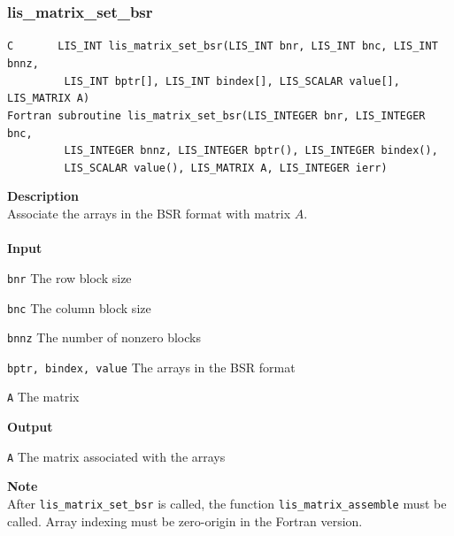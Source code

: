 \documentclass[a4paper]{article}
\newcommand{\namelistlabel}[1]{\mbox{#1}\hfill}
\newenvironment{namelist}[1]{%
\begin{list}{}
  {\let\makelabel\namelistlabel
  \settowidth{\labelwidth}{#1}
  \setlength{\leftmargin}{1.1\labelwidth}}
  }{%
\end{list}}
\begin{document}
\subsubsection{lis\_matrix\_set\_bsr}
\begin{screen}
\verb|C       LIS_INT lis_matrix_set_bsr(LIS_INT bnr, LIS_INT bnc, LIS_INT bnnz,|\\
\verb|         LIS_INT bptr[], LIS_INT bindex[], LIS_SCALAR value[], LIS_MATRIX A)|\\
\verb|Fortran subroutine lis_matrix_set_bsr(LIS_INTEGER bnr, LIS_INTEGER bnc,|\\
\verb|         LIS_INTEGER bnnz, LIS_INTEGER bptr(), LIS_INTEGER bindex(),|\\
\verb|         LIS_SCALAR value(), LIS_MATRIX A, LIS_INTEGER ierr)|
\end{screen}
{\bf Description}\\
\indent
Associate the arrays in the BSR format with matrix $A$.
\\ \\
\noindent
{\bf Input}
\begin{namelist}{XXXXXXXXXXXXXXXXXXXX}
\item[\tt bnr] The row block size
\item[\tt bnc] The column block size
\item[\tt bnnz] The number of nonzero blocks
\item[\tt bptr, bindex, value] The arrays in the BSR format
\item[\tt A] The matrix
\end{namelist}
{\bf Output}
\begin{namelist}{XXXXXXXXXXXXXXXXXXXX}
\item[\tt A] The matrix associated with the arrays
\end{namelist}
\noindent
{\bf Note}\\
\indent
After \verb|lis_matrix_set_bsr| is called, 
the function \verb|lis_matrix_assemble| must be called. 
Array indexing must be zero-origin in the Fortran version.
\end{document}
